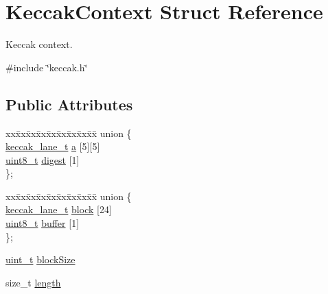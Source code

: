 \hypertarget{structKeccakContext}{}\section{Keccak\+Context Struct Reference}
\label{structKeccakContext}


Keccak context.  




{\ttfamily \#include \char`\"{}keccak.\+h\char`\"{}}

\subsection*{Public Attributes}
\begin{DoxyCompactItemize}
\item 
\begin{tabbing}
xx\=xx\=xx\=xx\=xx\=xx\=xx\=xx\=xx\=\kill
union \{\\
\>\hyperlink{keccak_8h_ad0c0a8baa1f82943a57b85bc3dfd3abc}{keccak\_lane\_t} \hyperlink{structKeccakContext_a990ac688d2a22e872cdab3d880418dc4}{a} \mbox{[}5\mbox{]}\mbox{[}5\mbox{]}\\
\>\hyperlink{stdint_8h_aba7bc1797add20fe3efdf37ced1182c5}{uint8\_t} \hyperlink{structKeccakContext_a4196dad6ace978207ffd2013474e4062}{digest} \mbox{[}1\mbox{]}\\
\}; \\

\end{tabbing}\item 
\begin{tabbing}
xx\=xx\=xx\=xx\=xx\=xx\=xx\=xx\=xx\=\kill
union \{\\
\>\hyperlink{keccak_8h_ad0c0a8baa1f82943a57b85bc3dfd3abc}{keccak\_lane\_t} \hyperlink{structKeccakContext_acfa449b5cd9c15e940b11703fb4cc937}{block} \mbox{[}24\mbox{]}\\
\>\hyperlink{stdint_8h_aba7bc1797add20fe3efdf37ced1182c5}{uint8\_t} \hyperlink{structKeccakContext_a449097a035be46c58179fa9a33f81bd6}{buffer} \mbox{[}1\mbox{]}\\
\}; \\

\end{tabbing}\item 
\hyperlink{compiler__port_8h_a12a1e9b3ce141648783a82445d02b58d}{uint\+\_\+t} \hyperlink{structKeccakContext_ae7a33ebbbcdcc2f688293684dfac9bc5}{block\+Size}
\item 
size\+\_\+t \hyperlink{structKeccakContext_aa29155c613493a5da2480aad142ebc96}{length}
\end{DoxyCompactItemize}


